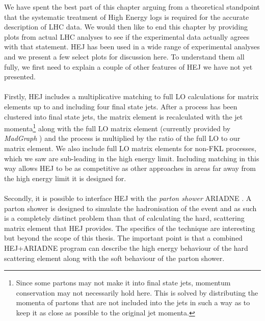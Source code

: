 We have spent the best part of this chapter arguing from a theoretical standpoint that the systematic treatment of High Energy logs is required for the accurate description of LHC data. We would then like to end this chapter by providing plots from actual LHC analyses to see if the experimental data actually agrees with that statement. HEJ has been used in a wide range of experimental analyses \cite{Aad2011, Chatrchyan2012, Chatrchyan2012a,Abazov2013,Aad2014a,Aad2014,Aad2015} and we present a few select plots for discussion here. To understand them all fully, we first need to explain a couple of other features of HEJ we have not yet presented. \\
\\
Firstly, HEJ includes a multiplicative matching to full LO calculations for matrix elements up to and including four final state jets. After a process has been clustered into final state jets, the matrix element is recalculated with the jet momenta\footnote{Since some partons may not make it into final state jets, momentum conservation may not necessarily hold here. This is solved by distributing the momenta of partons that are not included into the jets in such a way as to keep it as close as possible to the original jet momenta.} along with the full LO matrix element (currently provided by \emph{MadGraph} \cite{Alwall2011}) and the process is multiplied by the ratio of the full LO to our matrix element. We also include full LO matrix elements for non-FKL processes, which we saw are sub-leading in the high energy limit. Including matching in this way allows HEJ to be as competitive as other approaches in areas far away from the high energy limit it is designed for. \\
\\
Secondly, it is possible to interface HEJ with the \emph{parton shower} ARIADNE \cite{Andersen2011}. A parton shower is designed to simulate the hadronisation of the event and as such is a completely distinct problem than that of calculating the hard, scattering matrix element that HEJ provides. The specifics of the technique are interesting \cite{Hoche2014} but beyond the scope of this thesis. The important point is that a combined HEJ+ARIADNE program can describe the high energy behaviour of the hard scattering element along with the soft behaviour of the parton shower. 

